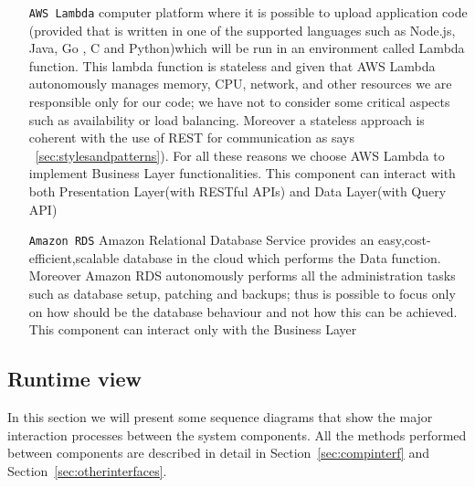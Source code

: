 \documentclass[../DD0.tex]{subfiles}
\begin{document}
\begin{itemize}

  \item [\texttt{AWS Lambda}] computer platform where it is possible to upload application code (provided that is written in one of the supported languages such as Node.js, Java, Go , C and Python)which will be run in an environment called Lambda function.
  This lambda function is stateless and given that AWS Lambda autonomously manages memory, CPU, network, and other resources we are responsible only for our code; we have not to consider some critical aspects such as availability or load balancing. 
  Moreover a stateless approach is coherent with the use of REST for communication as says ~\ref{sec:stylesandpatterns}).
  For all these reasons we choose AWS Lambda to implement Business Layer functionalities.
  This component can interact with both Presentation Layer(with RESTful APIs) and Data Layer(with Query API)

  \item [\texttt{Amazon RDS}] Amazon Relational Database Service provides an easy,cost-efficient,scalable database in the cloud which performs the Data function.
  Moreover Amazon RDS autonomously performs all the administration tasks such as database setup, patching and backups; thus is possible to focus only on how should be the database behaviour and not how this can be achieved.
  This component can interact only with the Business Layer
   

\end{itemize}



   

  \clearpage
  \subsection{Runtime view}
  \label{sec:runtview}

    In this section we will present some sequence diagrams that show the major interaction processes between the system components. All the methods performed between components are described in detail in Section~\ref{sec:compinterf} and Section~\ref{sec:otherinterfaces}.

\end{document}
